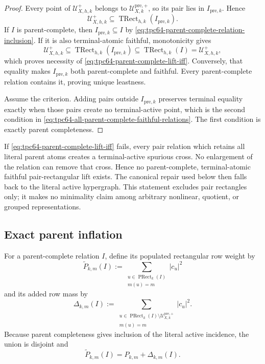 \begin{proof}
Every point of \(\mathcal U_{X,h,k}^{+}\) belongs to
\(\mathcal U_{X,k}^{\mathrm{pre},+}\), so its pair lies in
\(I_{\mathrm{pre},k}\).  Hence
\begin{equation}
 \mathcal U_{X,h,k}^{+}
 \subseteq
 \operatorname{TRect}_{h,k}(I_{\mathrm{pre},k}).
 \label{eq:tpc64-terminal-contained-in-parent-closure}
\end{equation}
If \(I\) is parent-complete, then
\(I_{\mathrm{pre},k}\subseteq I\) by
\eqref{eq:tpc64-parent-complete-relation-inclusion}.  If it is also
terminal-atomic faithful, monotonicity gives
\[
 \mathcal U_{X,h,k}^{+}
 \subseteq
 \operatorname{TRect}_{h,k}(I_{\mathrm{pre},k})
 \subseteq
 \operatorname{TRect}_{h,k}(I)
 =\mathcal U_{X,h,k}^{+},
\]
which proves necessity of
\eqref{eq:tpc64-parent-complete-lift-iff}.  Conversely, that equality
makes \(I_{\mathrm{pre},k}\) both parent-complete and faithful.
Every parent-complete relation contains it, proving unique leastness.

Assume the criterion.  Adding pairs outside \(I_{\mathrm{pre},k}\)
preserves terminal equality exactly when those pairs create no
terminal-active point, which is the second condition in
\eqref{eq:tpc64-all-parent-complete-faithful-relations}.  The first
condition is exactly parent completeness.
\end{proof}

If \eqref{eq:tpc64-parent-complete-lift-iff} fails, every pair relation
which retains all literal parent atoms creates a terminal-active spurious
cross.  No enlargement of the relation can remove that cross.  Hence no
parent-complete, terminal-atomic faithful pair-rectangular lift exists.  The
canonical repair used below then falls back to the literal active
hypergraph.  This statement excludes pair rectangles only; it makes no
minimality claim among arbitrary nonlinear, quotient, or grouped
representations.

\subsection{Exact parent inflation}

For a parent-complete relation \(I\), define its populated rectangular
row weight by
\begin{equation}
 \widetilde P_{k,m}(I)
 :=
 \sum_{\substack{u\in\operatorname{PRect}_k(I)\\m(u)=m}}
 |c_u|^2
 \label{eq:tpc64-rectangular-parent-weight}
\end{equation}
and its added row mass by
\begin{equation}
 \Delta_{k,m}(I)
 :=
 \sum_{\substack{
 u\in\operatorname{PRect}_k(I)
       \setminus\mathcal U_{X,k}^{\mathrm{pre},+}\\
 m(u)=m}}
 |c_u|^2.
 \label{eq:tpc64-block-added-parent-mass}
\end{equation}
Because parent completeness gives inclusion of the literal active
incidence, the union is disjoint and
\begin{equation}
 \boxed{
 \widetilde P_{k,m}(I)
 =P_{k,m}+\Delta_{k,m}(I).}
 \label{eq:tpc64-block-parent-inflation-identity}
\end{equation}

